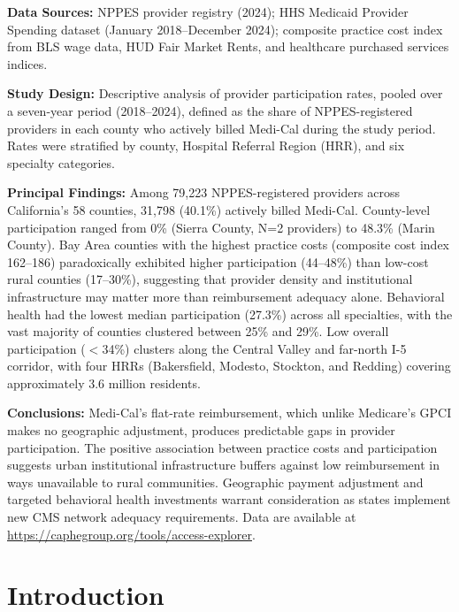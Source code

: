 \documentclass[12pt]{article}
\begin{document}
\textbf{Data Sources:} NPPES provider registry (2024); HHS Medicaid Provider Spending dataset (January 2018--December 2024); composite practice cost index from BLS wage data, HUD Fair Market Rents, and healthcare purchased services indices.

\textbf{Study Design:} Descriptive analysis of provider participation rates, pooled over a seven-year period (2018--2024), defined as the share of NPPES-registered providers in each county who actively billed Medi-Cal during the study period. Rates were stratified by county, Hospital Referral Region (HRR), and six specialty categories.

\textbf{Principal Findings:} Among 79,223 NPPES-registered providers across California's 58 counties, 31,798 (40.1\%) actively billed Medi-Cal. County-level participation ranged from 0\% (Sierra County, N=2 providers) to 48.3\% (Marin County). Bay Area counties with the highest practice costs (composite cost index 162--186) paradoxically exhibited higher participation (44--48\%) than low-cost rural counties (17--30\%), suggesting that provider density and institutional infrastructure may matter more than reimbursement adequacy alone. Behavioral health had the lowest median participation (27.3\%) across all specialties, with the vast majority of counties clustered between 25\% and 29\%. Low overall participation ($<$34\%) clusters along the Central Valley and far-north I-5 corridor, with four HRRs (Bakersfield, Modesto, Stockton, and Redding) covering approximately 3.6 million residents.

\textbf{Conclusions:} Medi-Cal's flat-rate reimbursement, which unlike Medicare's GPCI makes no geographic adjustment, produces predictable gaps in provider participation. The positive association between practice costs and participation suggests urban institutional infrastructure buffers against low reimbursement in ways unavailable to rural communities. Geographic payment adjustment and targeted behavioral health investments warrant consideration as states implement new CMS network adequacy requirements. Data are available at \url{https://caphegroup.org/tools/access-explorer}.

\newpage


\section{Introduction}
\end{document}
